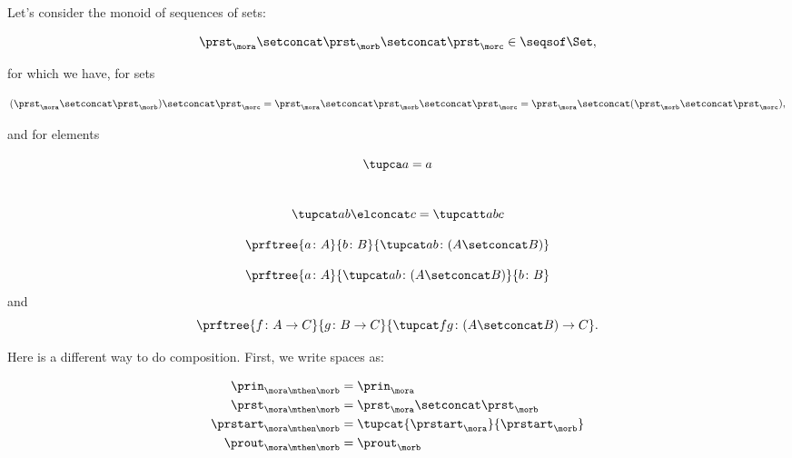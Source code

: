 Let's consider the monoid of sequences of sets:

\begin{equation}\label{eq:sets-monoid}
\prst_{\mora} \setconcat \prst_{\morb} \setconcat \prst_{\morc} \in \seqsof\Set,
\end{equation}

for which we have, for sets

\begin{equation}\label{eq:sets-monoid-comp}
  (\prst_{\mora} \setconcat \prst_{\morb} )\setconcat \prst_{\morc} =
  \prst_{\mora} \setconcat \prst_{\morb} \setconcat \prst_{\morc} =
  \prst_{\mora} \setconcat (\prst_{\morb} \setconcat \prst_{\morc}),
\end{equation}

and for elements

\begin{equation}
  \tupca a   = a
\end{equation}
~
\begin{equation}\label{eq:sets-monoid-el-cat}
   \tupcat a b \elconcat c = \tupcatt a b c
\end{equation}

\begin{equation}\label{eq:sets-monoid-axiom1}
  \prftree{a \colon A}{b \colon B}{ \tupcat a b \colon (A \setconcat B) }
\end{equation}

\begin{equation}\label{eq:sets-monoid-axiom2}
  \prftree{a \colon A}{ \tupcat a b \colon (A \setconcat B) }{  b \colon  B }
\end{equation}
and
\begin{equation}\label{eq:sets-monoid-maps}
  \prftree{ f \colon A \to C}{ g \colon B \to C}{ \tupcat f g \colon (A\setconcat B)\to C }.
\end{equation}


Here is a different way to do composition. First, we write spaces as:

\begin{equation}\label{eq:moore-comp-good-1}
  \begin{aligned}
  \prin_{\mora\mthen\morb} &= \prin_{\mora}   \\
  \prst_{\mora\mthen\morb} &= \prst_{\mora} \setconcat \prst_{\morb} \\
  \prstart_{\mora\mthen\morb} &= \tupcat{\prstart_{\mora}}{\prstart_{\morb}} \\
  \prout_{\mora\mthen\morb} &= \prout_{\morb} \\
  \end{aligned}
\end{equation}


